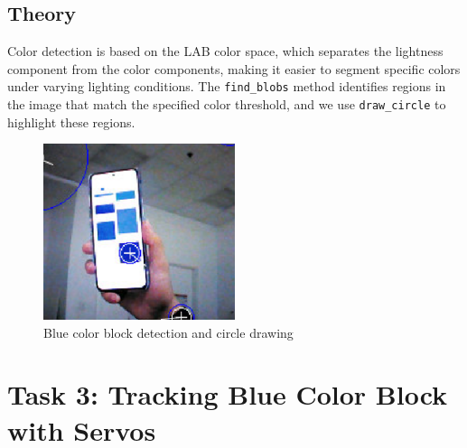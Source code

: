 \documentclass{article}
\begin{document}
\subsection{Theory}
Color detection is based on the LAB color space, which separates the lightness component from the color components, making it easier to segment specific colors under varying lighting conditions. The \texttt{find\_blobs} method identifies regions in the image that match the specified color threshold, and we use \texttt{draw\_circle} to highlight these regions.

\begin{figure}[H]
    \centering
    \includegraphics[width=0.5\textwidth]{blue_track.png}
    \caption{Blue color block detection and circle drawing}
\end{figure}

\section{Task 3: Tracking Blue Color Block with Servos}
\end{document}
